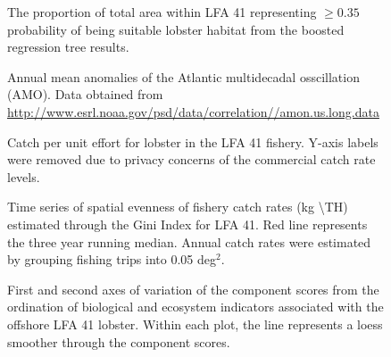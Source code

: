 \documentclass[11pt]{article}
\newcommand{\D}{.}
\newcommand{\e}{/backup/bio_data/bio.lobster/figures/} %
\begin{document}
\begin{figure}

    \caption{The proportion of total area within LFA 41 representing $\geq 0.35$ probability of being suitable lobster habitat from the boosted regression tree results. }

\end{figure}

\begin{figure}

    \caption{Annual mean anomalies of the Atlantic multidecadal osscillation (AMO). Data obtained from \url{http://www.esrl.noaa.gov/psd/data/correlation//amon.us.long.data}}

\end{figure}

\begin{figure}

    \caption{Catch per unit effort for lobster in the LFA 41 fishery. Y-axis labels were removed due to privacy concerns of the commercial catch rate levels.}

\end{figure}

\begin{figure}

    \caption{Time series of spatial evenness of fishery catch rates (kg \textbackslash TH) estimated through the Gini Index for LFA 41. Red line represents the three year running median. Annual catch rates were estimated by grouping fishing trips into 0.05 deg$^2$.}

\end{figure}
\clearpage
\begin{figure}

    
    \caption{First and second axes of variation of the component scores from the ordination of biological and ecosystem indicators associated with the offshore LFA 41 lobster. Within each plot, the line represents a loess smoother through the component scores.}

\end{figure}
\clearpage
\end{document}
